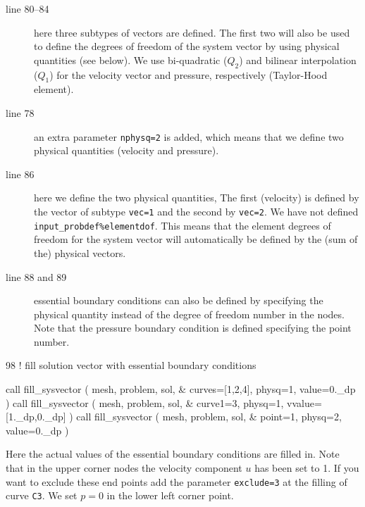 \begin{description}
   \item[line 80--84] here three subtypes of vectors are defined. The first two
will also be used to define the degrees of freedom of the system vector by
using physical quantities (see below). We use bi-quadratic ($Q_2$)
and bilinear interpolation ($Q_1$) for the velocity vector and pressure,
respectively (Taylor-Hood element).
   \item[line 78] an extra parameter \texttt{nphysq=2} is added, which means
that we define two physical quantities (velocity and pressure).
   \item[line 86] here we define the two physical quantities, The first
(velocity) is defined by the vector of subtype \texttt{vec=1} and the second by
\texttt{vec=2}. We have not defined \texttt{input\_probdef\%elementdof}. This
means
that the element degrees of freedom for the system vector will automatically be
defined by the (sum of the) physical vectors.
   \item[line 88 and 89] essential boundary conditions can also be defined by
specifying the physical quantity instead of the degree of freedom number in the
nodes. Note that the pressure boundary condition is defined specifying
 the point number.
\end{description}
\begin{listing}{98}
! fill solution vector with essential boundary conditions
                                                                                
  call fill_sysvector ( mesh, problem, sol, &
    curves=[1,2,4], physq=1, value=0._dp )
  call fill_sysvector ( mesh, problem, sol, &
    curve1=3, physq=1, vvalue=[1._dp,0._dp] )
  call fill_sysvector ( mesh, problem, sol, &
    point=1, physq=2, value=0._dp )
                                                                                
\end{listing}
Here the actual values of the essential boundary conditions are filled in. Note
that in the upper corner nodes the velocity component $u$ has been set to 1. If
you want to exclude these end points add the parameter \texttt{exclude=3} at
the filling of curve \texttt{C3}.
We set $p=0$ in the lower left corner point.


